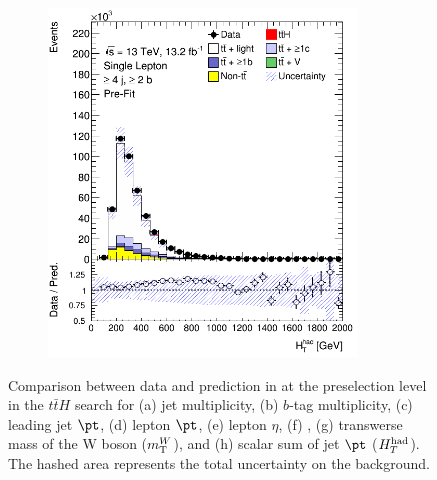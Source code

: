\begin{figure}[p]
\begin{center}
\begin{subfigure}{0.33\textwidth}
  \caption{}
  \label{}
\end{subfigure}
\begin{subfigure}{0.33\textwidth}
  \centering
  \includegraphics[width=0.9\textwidth]{figures/ttH/presel/ljets_HThad_ge4jge2b.png}
  \caption{}
  \label{}
\end{subfigure}
\end{center}
\captionsetup{width=0.85\textwidth}  \caption{\small Comparison between data and prediction in at the preselection level in the $t\bar{t}H$ search for (a) jet multiplicity, (b) $b$-tag multiplicity, (c) leading jet $\pt$, (d) lepton $\pt$, (e) lepton $\eta$, (f) \MET , (g) transwerse mass of the W boson ($m_{\rm T}^{W}$), and (h) scalar sum of jet $\pt$ ($H_{T}^{\rm had}$). The hashed area represents the total uncertainty on the background.}
\label{sec:tth:fig:1ldatamc}
\end{figure}